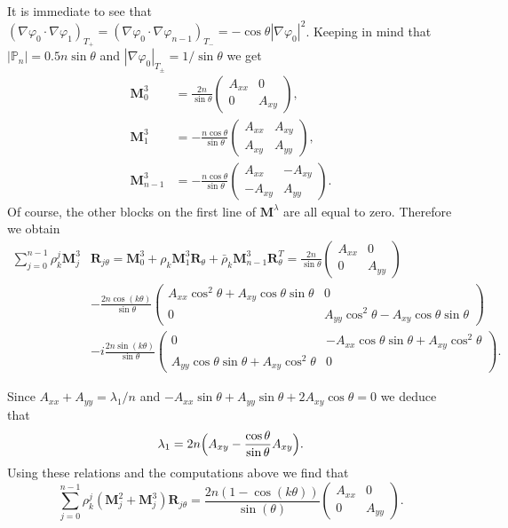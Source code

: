 \documentclass[JEP,XML,SOM,Unicode,ThmDefs,NoFloatCountersInSection,published]{cedram}
\theoremstyle{plain}
\theoremstyle{definition}
\newcommand{\bo}[1]{{\boldsymbol#1}}
\def\Pp{{\mathbb{P}_n}}
\begin{document}
It is immediate to see that $(\nabla \varphi_0\cdot \nabla \varphi_1)_{T_+} = (\nabla \varphi_0 \cdot \nabla \varphi_{n-1})_{T_-} = -\cos \theta |\nabla \varphi_0|^2$. Keeping in mind that $|\Pp| = 0.5 n \sin \theta$ and $|\nabla \varphi_0|_{T_\pm} = 1/\sin \theta$ we get\vspace*{-3pt}
\begin{align*}
\bo M_0^3 &= \frac{2n}{\sin \theta} \begin{pmatrix}
A_{xx} & 0 \\
0 & A_{xy}
\end{pmatrix},\\
\bo M_1^3 &= -\frac{n\cos \theta}{\sin \theta}\begin{pmatrix}
A_{xx} & A_{xy} \\
A_{xy} & A_{yy}
\end{pmatrix},\\
\bo M_{n-1}^3 &= -\frac{n\cos \theta}{\sin \theta} \begin{pmatrix}
A_{xx} & -A_{xy} \\
-A_{xy} & A_{yy}
\end{pmatrix}.
\end{align*}
Of course, the other blocks on the first line of $\bo M^\lambda$ are all equal to zero. Therefore we obtain\vspace*{-3pt}
\begin{align*}
\sum_{j=0}^{n-1} \rho_k^j \bo M_j^3& \bo R_{j\theta} = \bo M_0^3+ \rho_k \bo M_1^3\bo R_\theta+\bar \rho_k \bo M_{n-1}^3 \bo R_\theta^T = \frac{2n}{\sin \theta} \begin{pmatrix}
A_{xx} & 0 \\ 0 & A_{yy}
\end{pmatrix}\\[-3pt]
&-\frac{2n\cos(k\theta)}{\sin \theta}\begin{pmatrix}
A_{xx} \cos^2 \theta+A_{xy} \cos \theta \sin \theta & 0 \\
0 & A_{yy} \cos^2 \theta - A_{xy} \cos \theta \sin \theta
\end{pmatrix}\\
&-i\frac{2n\sin(k\theta)}{\sin \theta}
\begin{pmatrix}
0 & -A_{xx} \cos \theta\sin \theta+ A_{xy}\cos^2 \theta \\
A_{yy} \cos \theta\sin \theta+A_{xy}\cos^2 \theta & 0
\end{pmatrix}.
\end{align*}

Since $A_{xx}+A_{yy}=\lambda_1/n$ and $-A_{xx}\sin \theta+A_{yy}\sin \theta+2A_{xy}\cos \theta=0$ we deduce that\vspace*{-3pt}
\begin{equation}
\lambda_1 = 2n\Bigl(A_{xy}-\frac{\cos\theta}{\sin \theta}A_{xy}\Bigr).
\label{eq:criticality-tplus}
\end{equation}
Using these relations and the computations above we find that
\[
\sum_{j=0}^{n-1} \rho_k^j (\bo M_j^2+\bo M_j^3) \bo R_{j\theta}
= \frac{2n(1-\cos(k\theta))}{\sin(\theta)} \begin{pmatrix}
A_{xx} & 0 \\
0 & A_{yy}
\end{pmatrix}.
\]
\end{document}
